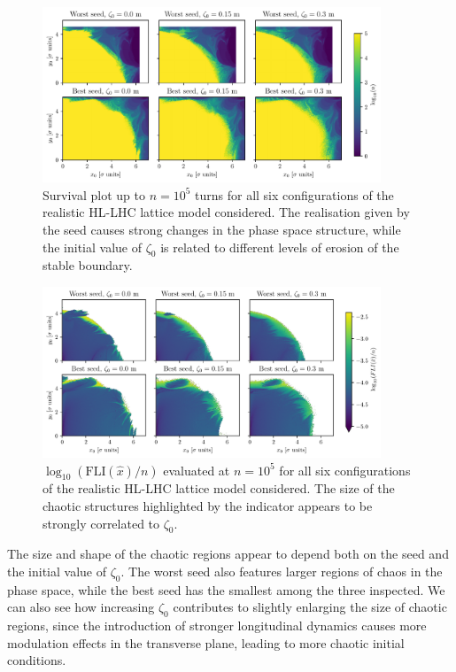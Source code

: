 \begin{figure}
    \centering
    \includegraphics[width=0.9\textwidth]{6_lhc_dynamic_indicators/figs/stability.pdf}
    \caption{Survival plot up to $n=10^5$ turns for all six configurations of the realistic HL-LHC lattice model considered. The realisation given by the seed causes strong changes in the phase space structure, while the initial value of $\zeta_0$ is related to different levels of erosion of the stable boundary.}
    \label{fig:true_survivors}
\end{figure}

\begin{figure}
    \centering
    \includegraphics[width=0.9\textwidth]{6_lhc_dynamic_indicators/figs/fli_all.pdf}
    \caption{$\log_{10}(\mathrm{FLI}(\hat{x})/n)$ evaluated at $n=10^5$ for all six configurations of the realistic HL-LHC lattice model considered. The size of the chaotic structures highlighted by the indicator appears to be strongly correlated to $\zeta_0$.}
    \label{fig:fli_all}
\end{figure}

The size and shape of the chaotic regions appear to depend both on the seed and the initial value of $\zeta_0$. The worst seed also features larger regions of chaos in the phase space, while the best seed has the smallest among the three inspected. We can also see how increasing $\zeta_0$ contributes to slightly enlarging the size of chaotic regions, since the introduction of stronger longitudinal dynamics causes more modulation effects in the transverse plane, leading to more chaotic initial conditions. 

